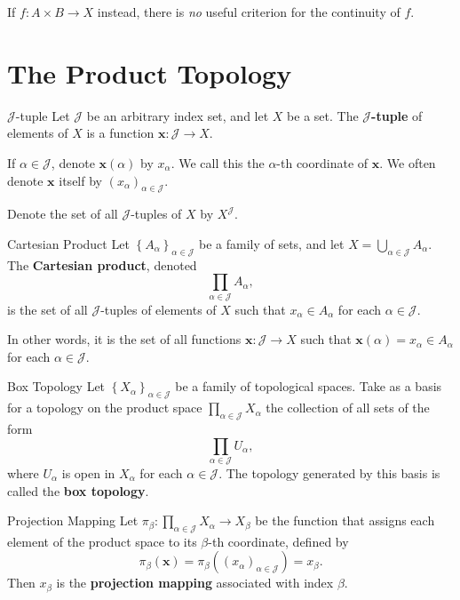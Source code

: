 \documentclass[10pt]{report}
\begin{document}
\begin{note}{}{}
	If $f:A\times B\to X$ instead, there is \textit{no} useful criterion for the continuity of $f$.
\end{note}



\section{The Product Topology}

\begin{defn}{$\mathcal{J}$-tuple}{}
	Let $\mathcal{J}$ be an arbitrary index set, and let $X$ be a set. The \textbf{$\mathcal{J}$-tuple} of elements of $X$ is a function $\mathbf{x}:\mathcal{J}\to X$.

	If $\alpha\in\mathcal{J}$, denote $\mathbf{x}(\alpha)$ by $x_{\alpha}$. We call this the $\alpha$-th coordinate of $\mathbf{x}$. We often denote $\mathbf{x}$ itself by $(x_{\alpha})_{\alpha\in\mathcal{J}}$.

	Denote the set of all $\mathcal{J}$-tuples of $X$ by $X^{\mathcal{J}}$.
\end{defn}

\begin{defn}{Cartesian Product}{}
Let $\left\{ A_{\alpha} \right\}_{\alpha\in\mathcal{J}}$ be a family of sets, and let $X = \bigcup_{\alpha\in\mathcal{J}}A_{\alpha}$. The \textbf{Cartesian product}, denoted
\[
\prod_{\alpha\in\mathcal{J}}A_{\alpha},
\] is the set of all $\mathcal{J}$-tuples of elements of $X$ such that $x_\alpha \in A_{\alpha}$ for each $\alpha\in\mathcal{J}$.

In other words, it is the set of all functions $\mathbf{x}:\mathcal{J}\to X$ such that $\mathbf{x}(\alpha)=x_{\alpha}\in A_{\alpha}$ for each $\alpha\in\mathcal{J}$.
\end{defn}

\begin{defn}{Box Topology}{}
Let $\left\{ X_{\alpha} \right\}_{\alpha\in\mathcal{J}}$ be a family of topological spaces. Take as a basis for a topology on the product space $\prod_{\alpha\in\mathcal{J}}X_{\alpha}$ the collection of all sets of the form
\[
\prod_{\alpha\in\mathcal{J}}U_{\alpha},
\] where $U_{\alpha}$ is open in $X_{\alpha}$ for each $\alpha\in\mathcal{J}$. The topology generated by this basis is called the \textbf{box topology}.
\end{defn}

\begin{defn}{Projection Mapping}{}
Let $\pi_{\beta}:\prod_{\alpha\in\mathcal{J}}X_{\alpha}\to X_{\beta}$ be the function that assigns each element of the product space to its $\beta$-th coordinate, defined by
\[
	\pi_{\beta}(\mathbf{x}) = \pi_{\beta}( (x_{\alpha})_{\alpha\in\mathcal{J}}) = x_{\beta}.
\] Then $x_{\beta}$ is the \textbf{projection mapping} associated with index $\beta$.
\end{defn}
\end{document}
